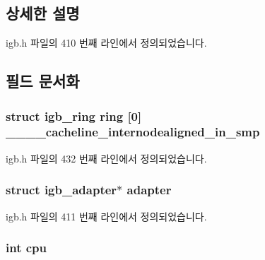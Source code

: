 \subsection{상세한 설명}


igb.\+h 파일의 410 번째 라인에서 정의되었습니다.



\subsection{필드 문서화}
\subsubsection[{\texorpdfstring{\+\_\+\+\_\+\+\_\+\+\_\+cacheline\+\_\+internodealigned\+\_\+in\+\_\+smp}{____cacheline_internodealigned_in_smp}}]{\setlength{\rightskip}{0pt plus 5cm}struct {\bf igb\+\_\+ring} ring \mbox{[}0\mbox{]} \+\_\+\+\_\+\+\_\+\+\_\+cacheline\+\_\+internodealigned\+\_\+in\+\_\+smp}\hypertarget{structigb__q__vector_a9fe456b522b4bed038608c9c85c55ec1}{}\label{structigb__q__vector_a9fe456b522b4bed038608c9c85c55ec1}


igb.\+h 파일의 432 번째 라인에서 정의되었습니다.

\subsubsection[{\texorpdfstring{adapter}{adapter}}]{\setlength{\rightskip}{0pt plus 5cm}struct {\bf igb\+\_\+adapter}$\ast$ {\bf adapter}}\hypertarget{structigb__q__vector_a194d1b705839346098846e03d7ae3108}{}\label{structigb__q__vector_a194d1b705839346098846e03d7ae3108}


igb.\+h 파일의 411 번째 라인에서 정의되었습니다.

\subsubsection[{\texorpdfstring{cpu}{cpu}}]{\setlength{\rightskip}{0pt plus 5cm}int cpu}\hypertarget{structigb__q__vector_a41a58b7c4446ab1abce89f43531cd523}{}\label{structigb__q__vector_a41a58b7c4446ab1abce89f43531cd523}


